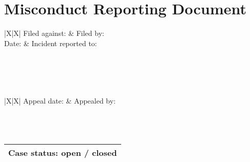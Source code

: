 \section{Misconduct Reporting Document}

\def\arraystretch{1.5}%

\vspace{1em}
\noindent \begin{tabularx}{\textwidth}{|X|X|} \hline
	Filed against: & Filed by: \\\hline
	Date:\vspace{1.5em} & Incident reported to:\vspace{1.5em} \\\hline
	 \\\hline
	 \\\hline
	 \\\hline
	 \\\hline
\end{tabularx}

\vspace{1em}
\noindent \begin{tabularx}{\textwidth}{|X|X|} \hline
	Appeal date: & Appealed by: \\\hline
	 \\\hline
	 \\\hline
	 \\\hline
\end{tabularx}

\vspace{1em}
\noindent \begin{tabularx}{\textwidth}{|X|} \hline
	Case status: open / closed \\\hline
\end{tabularx}
